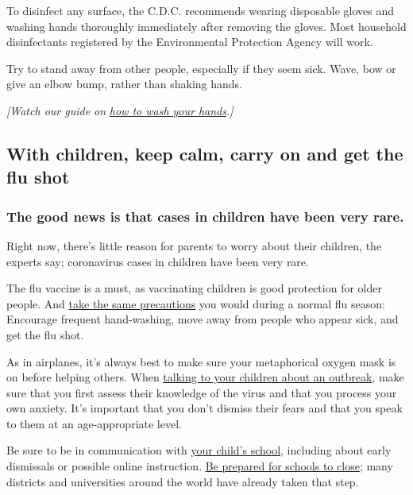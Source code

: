 To disinfect any surface, the C.D.C. recommends wearing disposable
gloves and washing hands thoroughly immediately after removing the
gloves. Most household disinfectants registered by the Environmental
Protection Agency will work.

Try to stand away from other people, especially if they seem sick. Wave,
bow or give an elbow bump, rather than shaking hands.

\emph{{[}Watch our guide on}
\href{https://www.nytimes.com/2020/03/13/world/how-to-wash-your-hands-coronavirus.html}{\emph{how
to wash your hands}}\emph{.{]}}

\hypertarget{with-children-keep-calm-carry-on-and-get-the-flu-shot}{%
\subsection{With children, keep calm, carry on and get the flu
shot}\label{with-children-keep-calm-carry-on-and-get-the-flu-shot}}

\hypertarget{the-good-news-is-that-cases-in-children-have-been-very-rare}{%
\subsubsection{\texorpdfstring{\textbf{The good news is that cases in
children have been very
rare.}}{The good news is that cases in children have been very rare.}}\label{the-good-news-is-that-cases-in-children-have-been-very-rare}}

Right now, there's little reason for parents to worry about their
children, the experts say; coronavirus cases in children have been very
rare.

The flu vaccine is a must, as vaccinating children is good protection
for older people. And
\href{https://www.nytimes.com/2020/03/09/parenting/coronavirus-parents-need-to-know.html}{take
the same precautions} you would during a normal flu season: Encourage
frequent hand-washing, move away from people who appear sick, and get
the flu shot.

As in airplanes, it's always best to make sure your metaphorical oxygen
mask is on before helping others. When
\href{https://parenting.nytimes.com/childrens-health/coronavirus-kids-talk}{talking
to your children about an outbreak}, make sure that you first assess
their knowledge of the virus and that you process your own anxiety. It's
important that you don't dismiss their fears and that you speak to them
at an age-appropriate level.

Be sure to be in communication with
\href{https://parenting.nytimes.com/childrens-health/coronavirus-outbreak-schools}{your
child's school}, including about early dismissals or possible online
instruction.
\href{https://www.nytimes.com/interactive/2020/nyregion/school-closings-ny-nj.html}{Be
prepared for schools to close}; many districts and universities around
the world have already taken that step.

